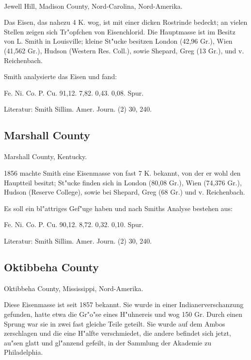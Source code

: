 \documentclass[a4paper, 11pt, oneside]{article}
\begin{document}
\paragraph{}
Jewell Hill, Madison County, Nord-Carolina, Nord-Amerika.

Das Eisen, das nahezu 4 K. wog, ist mit einer dicken Rostrinde bedeckt; an vielen Stellen zeigen sich Tr"opfchen von Eisenchlorid. Die Hauptmasse ist im Besitz von L. Smith in Louisville; kleine St"ucke besitzen London (42,96 Gr.), Wien (41,562 Gr.), Hudson (Western Res. Coll.), sowie Shepard, Greg (13 Gr.), und v. Reichenbach.

Smith analysierte das Eisen und fand:

Fe. Ni. Co. P. Cu.  
91,12. 7,82. 0,43. 0,08. Spur.

Literatur: Smith Sillim. Amer. Journ. (2) 30, 240.

\subsection{Marshall County}
\normalsize
\paragraph{}
Marshall County, Kentucky.

1856 machte Smith eine Eisenmasse von fast 7 K. bekannt, von der er wohl den Hauptteil besitzt; St"ucke finden sich in London (80,08 Gr.), Wien (74,376 Gr.), Hudson (Reserve College), sowie bei Shepard, Greg (68 Gr.) und v. Reichenbach.

Es soll ein bl"attriges Gef"uge haben und nach Smiths Analyse bestehen aus:

Fe. Ni. Co. P. Cu.  
90,12. 8,72. 0,32. 0,10. Spur.  

Literatur: Smith Sillim. Amer. Journ. (2) 30, 240.

\subsection{Oktibbeha County}
\normalsize
\paragraph{}
Oktibbeha County, Mississippi, Nord-Amerika.

Diese Eisenmasse ist seit 1857 bekannt. Sie wurde in einer Indianerverschanzung gefunden, hatte etwa die Gr"o"se eines H"uhnereis und wog 150 Gr. Durch einen Sprung war sie in zwei fast gleiche Teile geteilt. Sie wurde auf dem Ambos zerschlagen und die eine H"alfte verschmiedet, die andere befindet sich jetzt, au"sen glatt und gl"anzend gefeilt, in der Sammlung der Akademie zu Philadelphia.
\end{document}
